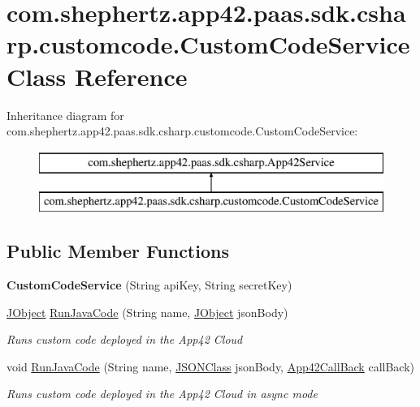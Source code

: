 \hypertarget{classcom_1_1shephertz_1_1app42_1_1paas_1_1sdk_1_1csharp_1_1customcode_1_1_custom_code_service}{\section{com.\+shephertz.\+app42.\+paas.\+sdk.\+csharp.\+customcode.\+Custom\+Code\+Service Class Reference}
\label{classcom_1_1shephertz_1_1app42_1_1paas_1_1sdk_1_1csharp_1_1customcode_1_1_custom_code_service}
}
Inheritance diagram for com.\+shephertz.\+app42.\+paas.\+sdk.\+csharp.\+customcode.\+Custom\+Code\+Service\+:\begin{figure}[H]
\begin{center}
\leavevmode
\includegraphics[height=2.000000cm]{classcom_1_1shephertz_1_1app42_1_1paas_1_1sdk_1_1csharp_1_1customcode_1_1_custom_code_service}
\end{center}
\end{figure}
\subsection*{Public Member Functions}
\begin{DoxyCompactItemize}
\item 
\hypertarget{classcom_1_1shephertz_1_1app42_1_1paas_1_1sdk_1_1csharp_1_1customcode_1_1_custom_code_service_a3523f22aa0838d040d63a51bcb4e425d}{{\bfseries Custom\+Code\+Service} (String api\+Key, String secret\+Key)}\label{classcom_1_1shephertz_1_1app42_1_1paas_1_1sdk_1_1csharp_1_1customcode_1_1_custom_code_service_a3523f22aa0838d040d63a51bcb4e425d}

\item 
\hyperlink{class_simple_j_s_o_n_1_1_j_object}{J\+Object} \hyperlink{classcom_1_1shephertz_1_1app42_1_1paas_1_1sdk_1_1csharp_1_1customcode_1_1_custom_code_service_a5081a067824b4c0173f04d1a11cdbccc}{Run\+Java\+Code} (String name, \hyperlink{class_simple_j_s_o_n_1_1_j_object}{J\+Object} json\+Body)
\begin{DoxyCompactList}\small\item\em Runs custom code deployed in the App42 Cloud \end{DoxyCompactList}\item 
void \hyperlink{classcom_1_1shephertz_1_1app42_1_1paas_1_1sdk_1_1csharp_1_1customcode_1_1_custom_code_service_a50dc52f2f3acba9ce32f6a1e3c498ba3}{Run\+Java\+Code} (String name, \hyperlink{class_simple_j_s_o_n_1_1_j_s_o_n_class}{J\+S\+O\+N\+Class} json\+Body, \hyperlink{interfacecom_1_1shephertz_1_1app42_1_1paas_1_1sdk_1_1csharp_1_1_app42_call_back}{App42\+Call\+Back} call\+Back)
\begin{DoxyCompactList}\small\item\em Runs custom code deployed in the App42 Cloud in async mode \end{DoxyCompactList}\end{DoxyCompactItemize}
